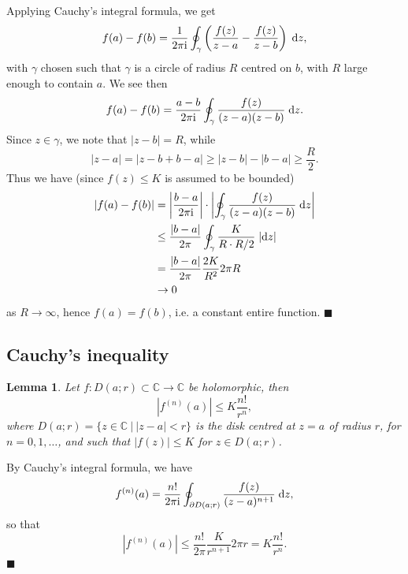 \documentclass[letter-paper]{tufte-book}
\newtheorem{lemma}[theorem]{\color{pastel-blue}Lemma}
\newenvironment{proof}[1][Proof]{\begin{trivlist}
\item[\hskip \labelsep {\bfseries #1}]}{\end{trivlist}}
\newcommand{\zi}{{\rm i}}
\newcommand{\qed}{\hfill$\blacksquare$}
\begin{document}
\begin{proof}
  Applying Cauchy's integral formula, we get
  \begin{equation*}
    f(a) - f(b) = \frac{1}{2\pi\zi}\oint_\gamma\left( \frac{f(z)}{z-a} - \frac{f(z)}{z-b}\right)\; \mathrm{d}z,
  \end{equation*}
  with $\gamma$ chosen such that $\gamma$ is a circle of radius $R$ centred on
  $b$, with $R$ large enough to contain $a$. We see then
  \begin{equation*}
    f(a) - f(b) = \frac{a-b}{2\pi\zi}\oint_\gamma \frac{f(z)}{(z-a)(z-b)}\; \mathrm{d}z.
  \end{equation*}
  Since $z\in\gamma$, we note that $|z-b| = R$, while
  \begin{equation*}
    |z-a| = |z - b + b -a| \geq |z-b| - |b-a| \geq \frac{R}{2}.
  \end{equation*}
  Thus we have (since $f(z) \leq K$ is assumed to be bounded)
  \begin{align*}
    |f(a) - f(b)| &= \left|\frac{b-a}{2\pi\zi}\right| \cdot \left| \oint_\gamma \frac{f(z)}{(z-a)(z-b)}\; \mathrm{d}z\right|\\
      &\leq \frac{|b-a|}{2\pi} \oint_\gamma \frac{K}{R \cdot R/2}\; |\mathrm{d}z| \\
      &= \frac{|b-a|}{2\pi} \frac{2K}{R^2} 2\pi R \\
      &\to 0
  \end{align*}
  as $R\to\infty$, hence $f(a) = f(b)$, i.e. a constant entire function. \qed
\end{proof}


\subsection{Cauchy's inequality}

\begin{lemma}
  Let $f:D(a;r) \subset \mathbb{C} \to \mathbb{C}$ be holomorphic, then
  \begin{equation}
    \left|f^{(n)}(a)\right| \leq K\frac{n!}{r^n},
  \end{equation}
  where $D(a; r) = \{z\in\mathbb{C}\ |\ |z-a| < r\}$ is the disk centred at
  $z=a$ of radius $r$, for $n=0, 1, \ldots$, and such that $|f(z)| \leq K$ for
  $z\in D(a;r)$.
\end{lemma}

\begin{proof}
  By Cauchy's integral formula, we have
  \begin{equation*}
    f^{(n)}(a) = \frac{n!}{2\pi\zi} \oint_{\partial D(a;r)} \frac{f(z)}{(z-a)^{n+1}}\; \mathrm{d}z,
  \end{equation*}
  so that
  \begin{equation*}
    \left|f^{(n)}(a)\right| \leq \frac{n!}{2\pi} \frac{K}{r^{n+1}} 2\pi r = K\frac{n!}{r^n}.
  \end{equation*}
  \qed
\end{proof}
\end{document}
